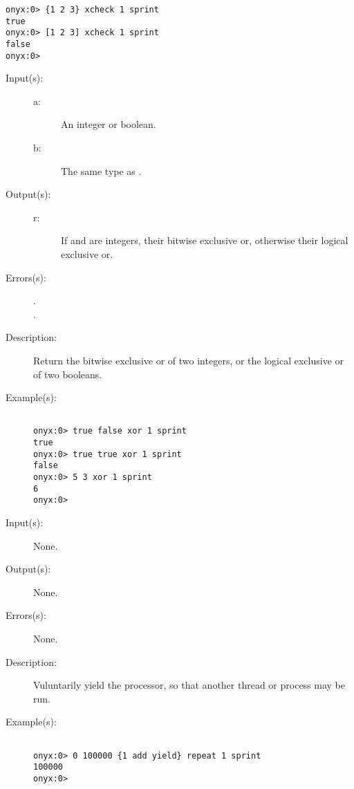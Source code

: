 \begin{description}
\begin{description}
\begin{verbatim}
onyx:0> {1 2 3} xcheck 1 sprint
true
onyx:0> [1 2 3] xcheck 1 sprint
false
onyx:0>
		\end{verbatim}
	\end{description}
\label{systemdict:xor}
\item[{\onyxop{a b}{xor}{r}}: ]
	\begin{description}\item[]
	\item[Input(s): ]
		\begin{description}\item[]
		\item[a: ]
			An integer or boolean.
		\item[b: ]
			The same type as .
		\end{description}
	\item[Output(s): ]
		\begin{description}\item[]
		\item[r: ]
			If  and  are integers, their bitwise
			exclusive or, otherwise their logical exclusive or.
		\end{description}
	\item[Errors(s): ]
		\begin{description}\item[]
		\item[.]
		\item[.]
		\end{description}
	\item[Description: ]
		Return the bitwise exclusive or of two integers, or the logical
		exclusive or of two booleans.
	\item[Example(s): ]\begin{verbatim}

onyx:0> true false xor 1 sprint
true
onyx:0> true true xor 1 sprint
false
onyx:0> 5 3 xor 1 sprint
6
onyx:0>
		\end{verbatim}
	\end{description}
\label{systemdict:yield}
\item[{\onyxop{--}{yield}{--}}: ]
	\begin{description}\item[]
	\item[Input(s): ] None.
	\item[Output(s): ] None.
	\item[Errors(s): ] None.
	\item[Description: ]
		Vuluntarily yield the processor, so that another thread or
		process may be run.
	\item[Example(s): ]\begin{verbatim}

onyx:0> 0 100000 {1 add yield} repeat 1 sprint
100000
onyx:0>
		\end{verbatim}
	\end{description}
\end{description}

